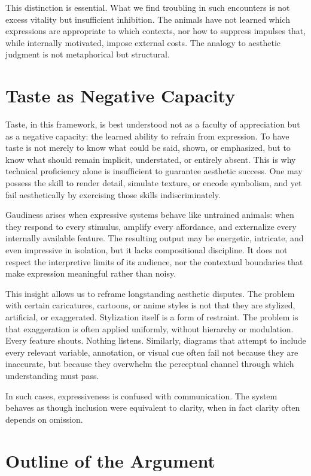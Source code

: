 \documentclass[12pt]{article}
\begin{document}
This distinction is essential. What we find troubling in such encounters is not excess vitality but insufficient inhibition. The animals have not learned which expressions are appropriate to which contexts, nor how to suppress impulses that, while internally motivated, impose external costs. The analogy to aesthetic judgment is not metaphorical but structural.

\section{Taste as Negative Capacity}

Taste, in this framework, is best understood not as a faculty of appreciation but as a negative capacity: the learned ability to refrain from expression. To have taste is not merely to know what could be said, shown, or emphasized, but to know what should remain implicit, understated, or entirely absent. This is why technical proficiency alone is insufficient to guarantee aesthetic success. One may possess the skill to render detail, simulate texture, or encode symbolism, and yet fail aesthetically by exercising those skills indiscriminately.

Gaudiness arises when expressive systems behave like untrained animals: when they respond to every stimulus, amplify every affordance, and externalize every internally available feature. The resulting output may be energetic, intricate, and even impressive in isolation, but it lacks compositional discipline. It does not respect the interpretive limits of its audience, nor the contextual boundaries that make expression meaningful rather than noisy.

This insight allows us to reframe longstanding aesthetic disputes. The problem with certain caricatures, cartoons, or anime styles is not that they are stylized, artificial, or exaggerated. Stylization itself is a form of restraint. The problem is that exaggeration is often applied uniformly, without hierarchy or modulation. Every feature shouts. Nothing listens. Similarly, diagrams that attempt to include every relevant variable, annotation, or visual cue often fail not because they are inaccurate, but because they overwhelm the perceptual channel through which understanding must pass.

In such cases, expressiveness is confused with communication. The system behaves as though inclusion were equivalent to clarity, when in fact clarity often depends on omission.

\section{Outline of the Argument}
\end{document}
